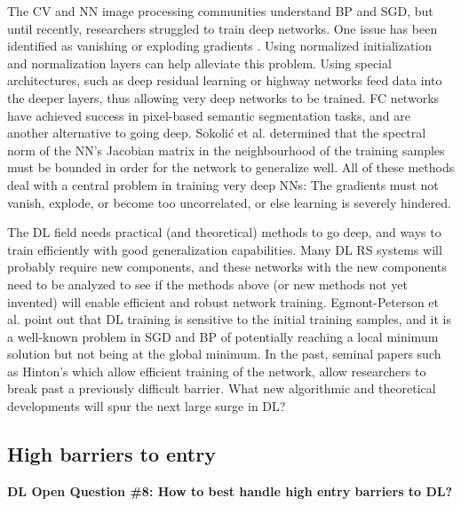 \documentclass[12pt]{spieman}
\begin{document}
\begin{spacing}{1}
The CV and NN image processing communities understand BP and SGD, but until recently, researchers struggled to train deep networks. One issue has been identified as vanishing or exploding gradients \cite{bengio1994learning, glorot2010understanding} . Using normalized initialization and normalization layers can help alleviate this problem. Using special architectures, such as deep residual learning \cite{he2016deep} or highway networks \cite{srivastava2015training} feed data into the deeper layers, thus allowing very deep networks to be trained. FC networks \cite{long2015fully} have achieved success in pixel-based semantic segmentation tasks, and are another alternative to going deep. Sokoli\'{c} et al. \cite{sokolic2016robust} determined that the spectral norm of the NN's Jacobian matrix in the neighbourhood of the training samples must be bounded in order for the network to generalize well. All of these methods deal with a central problem in training very deep NNs: The gradients must not vanish, explode, or become too uncorrelated, or else learning is severely hindered.

The DL field needs practical (and theoretical) methods to go deep, and ways to train efficiently with good generalization capabilities. Many DL RS systems will probably require new components, and these networks with the new components need to be analyzed to see if the methods above (or new methods not yet invented) will enable efficient and robust network training. Egmont-Peterson et al. \cite{Egmont-Petersen2002} point out that DL training is sensitive to the initial training samples, and it is a well-known problem in SGD and BP of potentially reaching a local minimum solution but not being at the global minimum. In the past, seminal papers such as Hinton's \cite{hinton2006fast} which allow efficient training of the network, allow researchers to break past a previously difficult barrier. What new algorithmic and theoretical developments will spur the next large surge in DL?

%
%
\subsection{High barriers to entry}
\label{subsec:ChallengesOpportunities_viii}
\textbf{DL Open Question \#8: How to best handle high entry barriers to DL?}


\end{spacing}
\end{document}
